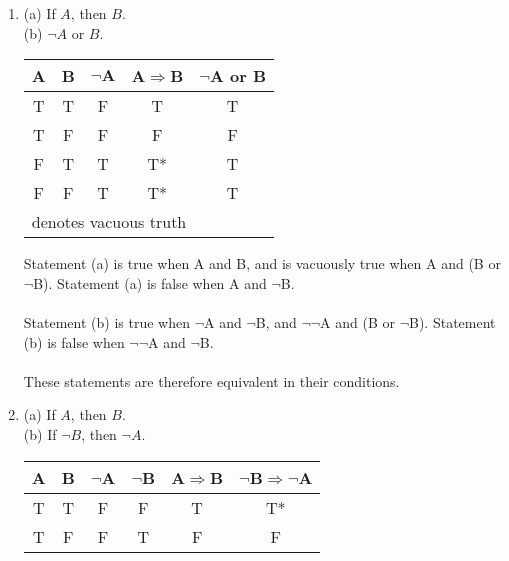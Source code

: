 \documentclass{article}
\begin{document}
\begin{enumerate}[label=(4.\arabic*),start=1]
\begin{enumerate}[label=(Condition \arabic*.),start=1]
        \end{enumerate}
    \item (a) If $A$, then $B$. \\
          (b) $\neg$$A$ or $B$. \\
        \begin{center}
          \begin{tabular}{c|c|c||c||c}
            \textbf{A} & \textbf{B} & \textbf{$\neg\textbf{A}$} & \textbf{A$\Rightarrow$B} & \textbf{$\neg$A or B} \\\hline
            T & T & F & T & T \\\hline
            T & F & F & F & F \\\hline
            F & T & T & \hspace{2mm}T* & T \\\hline
            F & F & T & \hspace{2mm}T* & T \\\hline
            \multicolumn{5}{l}{\footnotesize * denotes vacuous truth}
          \end{tabular}
        \end{center}
        Statement (a) is true when A and B, and is vacuously true when A and (B or $\neg$B). Statement (a) is false when A and $\neg$B. \\
        \\
        Statement (b) is true when $\neg$A and $\neg$B, and $\neg$$\neg$A and (B or $\neg$B). Statement (b) is false when $\neg$$\neg$A and $\neg$B. \\
        \\
        These statements are therefore equivalent in their conditions. %
    \item (a) If $A$, then $B$. \\
          (b) If $\neg$$B$, then $\neg$$A$. \\
          \begin{center}
            \begin{tabular}{c|c|c|c||c||c}
                \textbf{A} & \textbf{B} & \textbf{$\neg$A} & \textbf{$\neg$B} & \textbf{A$\Rightarrow$B} & \textbf{$\neg$B$\Rightarrow$$\neg$A} \\\hline
                T & T & F & F & T & \hspace{2mm}T*              \\\hline
                T & F & F & T & F & F                           \\\hline

\end{tabular}
\end{center}$$
\end{enumerate}
\end{document}
